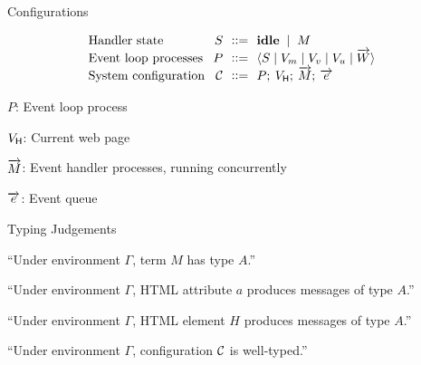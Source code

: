 \documentclass[11.5pt, aspectratio=169]{beamer}
\begin{document}
\begin{frame}{Configurations}

  {\Large
    \[
      \begin{array}{@{}l@{\:\:\:}r@{\:\:\:}c@{\:\:\:}l}
      \text{Handler state} & S & ::= & \idle \midspace M \\
      \text{Event loop processes} & P & ::= & \handlerproc{S}{V_m}{V_v}{V_u}{\seq{W}} \\
      \text{System configuration} & \config{C} & ::= & \sys{P}{\vh}{\seq{M}}{\seq{e}} \\
    \end{array}
  \]
  }

  \vspace{2em}

  \begin{fullpageitemize}
    \item $P$: Event loop process
    \item $V_{\textsf{H}}$: Current web page
    \item $\overrightarrow{M}$: Event handler processes, running concurrently
    \item $\overrightarrow{e}$: Event queue
  \end{fullpageitemize}
\end{frame}

\begin{frame}{Typing Judgements}

  \begin{center}
  {\Huge {}}
  \vspace{0.5em}

    ``Under environment $\Gamma$, term $M$ has type $A$.''
  \end{center}
  \vspace{0.75em}

  \begin{center}
  {\Huge {}}
  \vspace{0.5em}

    ``Under environment $\Gamma$, HTML attribute $a$ produces messages of type $A$.''
  \end{center}
  \vspace{0.75em}

  \begin{center}
  {\Huge {}}
  \vspace{0.5em}

    ``Under environment $\Gamma$, HTML element $H$ produces messages of type $A$.''
  \end{center}
  \vspace{0.75em}

  \begin{center}
    {\Huge {}}
  \vspace{0.5em}

  ``Under environment $\Gamma$, configuration $\mathcal{C}$ is well-typed.''
  \end{center}
\end{frame}
\end{document}
